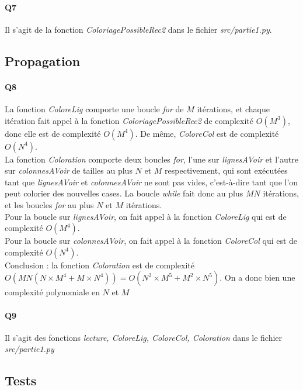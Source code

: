 \documentclass[12pt]{article}
\begin{document}
		\paragraph{Q7}
			Il s'agit de la fonction \textit{ColoriagePossibleRec2} dans le fichier \textit{src/partie1.py}.
	
		\subsection{Propagation}
		
			\paragraph{Q8}
				La fonction \textit{ColoreLig} comporte une boucle \textit{for} de $ M $ itérations, et chaque itération fait appel à la fonction \textit{ColoriagePossibleRec2} de complexité $ O(M^3) $, donc elle est de complexité $ O(M^4) $. De même, \textit{ColoreCol} est de complexité $ O(N^4) $. \\
				La fonction \textit{Coloration} comporte deux boucles \textit{for}, l'une sur \textit{lignesAVoir} et l'autre sur \textit{colonnesAVoir} de tailles au plus $ N $ et $ M $ respectivement, qui sont exécutées tant que \textit{lignesAVoir} et \textit{colonnesAVoir} ne sont pas vides, c'est-à-dire tant que l'on peut colorier des nouvelles cases. La boucle \textit{while} fait donc au plus $ MN $ itérations, et les boucles \textit{for} au plus $ N $ et $ M $ itérations. \\
				Pour la boucle sur \textit{lignesAVoir}, on fait appel à la fonction \textit{ColoreLig} qui est de complexité $ O(M^4) $. \\
				Pour la boucle sur \textit{colonnesAVoir}, on fait appel à la fonction \textit{ColoreCol} qui est de complexité $ O(N^4) $. \\
				Conclusion : la fonction \textit{Coloration} est de complexité $ O(MN(N \times M^4 + M \times N^4)) = \boxed{O(N^2 \times M^5 + M^2 \times N^5)} $. On a donc bien une complexité polynomiale en $ N $ et $ M $
			
			\paragraph{Q9}
				Il s'agit des fonctions \textit{lecture, ColoreLig, ColoreCol, Coloration} dans le fichier \textit{src/partie1.py}
			
		\subsection{Tests}
		
\end{document}
